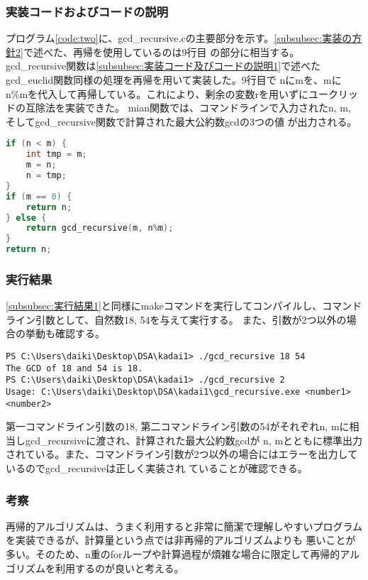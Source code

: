 \documentclass{ltjsarticle}
\begin{document}
\subsubsection{実装コードおよびコードの説明}
プログラム\ref{code:two}に、gcd\_recursive.cの主要部分を示す。\ref{subsubsec:実装の方針2}で述べた、再帰を使用しているのは9行目
の部分に相当する。\\ \indent
gcd\_recursive関数は\ref{subsubsec:実装コード及びコードの説明1}で述べたgcd\_euclid関数同様の処理を再帰を用いて実装した。9行目で
nにmを、mにn\%mを代入して再帰している。これにより、剰余の変数rを用いずにユークリッドの互除法を実装できた。
mian関数では、コマンドラインで入力されたn, m, そしてgcd\_recursive関数で計算された最大公約数gcdの3つの値
が出力される。
\begin{lstlisting}[caption=gcd\_recursive.cの主要部, label=code:two, language=C]
if (n < m) {
    int tmp = m;
    m = n;
    n = tmp;
}
if (m == 0) { 
    return n;
} else {
    return gcd_recursive(m, n%m);
}
return n;
\end{lstlisting}
\subsubsection{実行結果}
\ref{subsubsec:実行結果1}と同様にmakeコマンドを実行してコンパイルし、コマンドライン引数として、自然数18, 54を与えて実行する。
また、引数が2つ以外の場合の挙動も確認する。
\begin{lstlisting}
PS C:\Users\daiki\Desktop\DSA\kadai1> ./gcd_recursive 18 54
The GCD of 18 and 54 is 18.
PS C:\Users\daiki\Desktop\DSA\kadai1> ./gcd_recursive 2
Usage: C:\Users\daiki\Desktop\DSA\kadai1\gcd_recursive.exe <number1> <number2>   
\end{lstlisting}
第一コマンドライン引数の18, 第二コマンドライン引数の54がそれぞれn, mに相当しgcd\_recursiveに渡され、計算された最大公約数gcdが
n, mとともに標準出力されている。また、コマンドライン引数が2つ以外の場合にはエラーを出力しているのでgcd\_recursiveは正しく実装され
ていることが確認できる。
\subsubsection{考察}
再帰的アルゴリズムは、うまく利用すると非常に簡潔で理解しやすいプログラムを実装できるが、計算量という点では非再帰的アルゴリズムよりも
悪いことが多い。そのため、n重のforループや計算過程が煩雑な場合に限定して再帰的アルゴリズムを利用するのが良いと考える。
\end{document}
